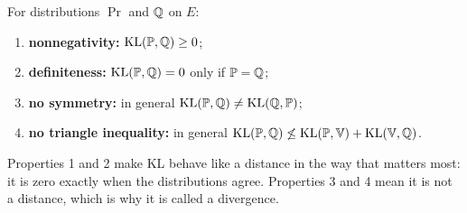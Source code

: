 \begin{proposition}
\label{prop:kl-properties}
For distributions $\Pr$ and $\mathbb{Q}$ on $E$:
\begin{enumerate}[nosep]
\item \textbf{nonnegativity:} $\mathrm{KL}(\mathbb{P}, \mathbb{Q}) \geq 0$;
\item \textbf{definiteness:} $\mathrm{KL}(\mathbb{P}, \mathbb{Q}) = 0$ only if $\mathbb{P} = \mathbb{Q}$;
\item \textbf{no symmetry:} in general $\mathrm{KL}(\mathbb{P}, \mathbb{Q}) \neq \mathrm{KL}(\mathbb{Q}, \mathbb{P})$;
\item \textbf{no triangle inequality:} in general $\mathrm{KL}(\mathbb{P}, \mathbb{Q}) \not\leq \mathrm{KL}(\mathbb{P}, \mathbb{V}) + \mathrm{KL}(\mathbb{V}, \mathbb{Q})$.
\end{enumerate}
Properties 1 and 2 make KL behave like a distance in the way that matters most: it is zero exactly when the distributions agree. Properties 3 and 4 mean it is not a distance, which is why it is called a divergence.
\end{proposition}

